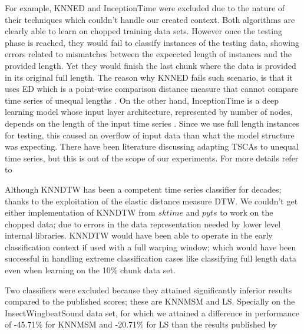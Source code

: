For example, KNNED and InceptionTime were excluded due to the nature of their techniques which couldn't handle our created context.
Both algorithms are clearly able to learn on chopped training data sets.
However once the testing phase is reached, they would fail to classify instances of the testing data,
showing errors related to mismatches between the expeccted length of instances and the provided length.
Yet they would finish the last chunk where the data is provided in its original full length.
The reason why KNNED fails such scenario, is that it uses ED which is a point-wise comparison distance measure that cannot compare time series of unequal lengths \cite{tan2019time}.
On the other hand, InceptionTime is a deep learning model whose input layer architecture, represented by number of nodes, depends on the length of the input time series \cite{fawaz2019deepreview}.
Since we use full length instances for testing, this caused an overflow of input data than what the model structure was expecting.
There have been literature discussing adapting TSCAs to unequal time series, but this is out of the scope of our experiments.
For more details refer to \cite{caiado2009comparison, tan2019time, fawaz2019deepreview}


Although KNNDTW has been a competent time series classifier for decades; thanks to the exploitation of the elastic distance measure DTW.
We couldn't get either implementation of KNNDTW from $sktime$ and $pyts$ to work on the chopped data; due to errors in the data representation needed by lower level internal libraries.
KNNDTW would have been able to operate in the early classification context if used with a full warping window; which would have been successful in handling extreme classification cases like classifying full length data
even when learning on the 10\% chunk data set.


Two classifiers were excluded because they attained significantly inferior results compared to the published scores; these are KNNMSM and LS.
Specially on the InsectWingbeatSound data set, for which we attained a difference in performance of -45.71\% for KNNMSM and -20.71\% for LS than the results published by \cite{bagnall2017great}


